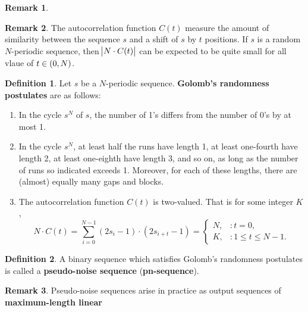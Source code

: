 \documentclass[12pt,openany]{book}
\theoremstyle{definition}
\newtheorem{definition}{Definition}[chapter]
\newtheorem{remark}{Remark}[chapter]
\begin{document}
\begin{remark}
	
\end{remark}
\begin{remark}
	The autocorrelation function $C(t)$ measure the amount of similarity between the sequence $s$ and a shift of $s$ by $t$ positions. If $s$ is a random $N$-periodic sequence, then $\abs{N\cdot C(t)}$ can be expected to be quite small for all vlaue of $t\in\intoo{0,N}$. 
\end{remark}
\begin{tcolorbox}[colback=white,colframe=defcolor,arc=5pt,title={\color{white}\bf Golomb's randomness postulates}]
	\begin{definition}
		Let \( s \) be a $N$-periodic sequence. \textbf{Golomb's randomness postulates} are as follows:
		\begin{enumerate}[\textbf{R}1]
			\item In the cycle \( s^N \) of \( s \), the number of 1’s differs from the number of 0’s by at most 1.
			\item In the cycle \( s^N \), at least half the runs have length 1, at least one-fourth have length 2, at least one-eighth have length 3, and so on, as long as the number of runs so indicated exceeds 1. Moreover, for each of these lengths, there are (almost) equally many gaps and blocks.
			\item The autocorrelation function \( C(t) \) is two-valued. That is for some integer \( K \),
			\[
			N \cdot C(t) = \sum_{i=0}^{N-1}(2s_i - 1) \cdot (2s_{i+t} - 1)=
			\begin{cases} 
				N, & : t = 0, \\
				K, & : 1 \leq t \leq N - 1.
			\end{cases}
			\]
		\end{enumerate}
	\end{definition}
\end{tcolorbox}

\begin{tcolorbox}[colback=white,colframe=defcolor,arc=5pt,title={\color{white}\bf \textbf{Pseudo-Noise Sequence} (\textbf{pn-sequence})}]
	\begin{definition}
		A binary sequence which satisfies Golomb's randomness postulates is called a \textbf{pseudo-noise sequence} (\textbf{pn-sequence}).
	\end{definition}
\end{tcolorbox}
\begin{remark}
	Pseudo-noise sequences arise in practice as output sequences of \textbf{maximum-length linear }
\end{remark}
\end{document}
